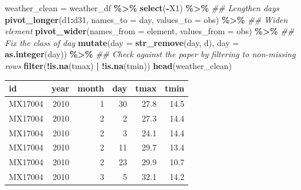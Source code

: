 \documentclass[
]{article}
\newenvironment{Shaded}{\begin{snugshade}}{\end{snugshade}}
\newcommand{\CommentTok}[1]{\textcolor[rgb]{0.56,0.35,0.01}{\textit{#1}}}
\newcommand{\DataTypeTok}[1]{\textcolor[rgb]{0.13,0.29,0.53}{#1}}
\newcommand{\KeywordTok}[1]{\textcolor[rgb]{0.13,0.29,0.53}{\textbf{#1}}}
\newcommand{\NormalTok}[1]{#1}
\newcommand{\OperatorTok}[1]{\textcolor[rgb]{0.81,0.36,0.00}{\textbf{#1}}}
\newcommand{\StringTok}[1]{\textcolor[rgb]{0.31,0.60,0.02}{#1}}
\begin{document}
\begin{Shaded}
\begin{Highlighting}[]
\NormalTok{weather\_clean =}\StringTok{ }\NormalTok{weather\_df }\OperatorTok{\%\textgreater{}\%}\StringTok{ }
\StringTok{    }\KeywordTok{select}\NormalTok{(}\OperatorTok{{-}}\NormalTok{X1) }\OperatorTok{\%\textgreater{}\%}\StringTok{ }
\StringTok{    }\CommentTok{\#\# Lengthen days}
\StringTok{    }\KeywordTok{pivot\_longer}\NormalTok{(d1}\OperatorTok{:}\NormalTok{d31, }
                 \DataTypeTok{names\_to =} \StringTok{\textquotesingle{}day\textquotesingle{}}\NormalTok{, }
                 \DataTypeTok{values\_to =} \StringTok{\textquotesingle{}obs\textquotesingle{}}\NormalTok{) }\OperatorTok{\%\textgreater{}\%}\StringTok{ }
\StringTok{    }\CommentTok{\#\# Widen \textasciigrave{}element\textasciigrave{}}
\StringTok{    }\KeywordTok{pivot\_wider}\NormalTok{(}\DataTypeTok{names\_from =}\NormalTok{ element, }
                \DataTypeTok{values\_from =}\NormalTok{ obs) }\OperatorTok{\%\textgreater{}\%}\StringTok{ }
\StringTok{    }\CommentTok{\#\# Fix the class of \textasciigrave{}day\textasciigrave{}}
\StringTok{    }\KeywordTok{mutate}\NormalTok{(}\DataTypeTok{day =} \KeywordTok{str\_remove}\NormalTok{(day, }\StringTok{\textquotesingle{}d\textquotesingle{}}\NormalTok{), }
           \DataTypeTok{day =} \KeywordTok{as.integer}\NormalTok{(day)) }\OperatorTok{\%\textgreater{}\%}\StringTok{ }
\StringTok{    }\CommentTok{\#\# Check against the paper by filtering to non{-}missing rows}
\StringTok{    }\KeywordTok{filter}\NormalTok{(}\OperatorTok{!}\KeywordTok{is.na}\NormalTok{(tmax) }\OperatorTok{|}\StringTok{ }\OperatorTok{!}\KeywordTok{is.na}\NormalTok{(tmin))}
\KeywordTok{head}\NormalTok{(weather\_clean)}
\end{Highlighting}
\end{Shaded}

\begin{tabular}{l|r|r|r|r|r}
\hline
id & year & month & day & tmax & tmin\\
\hline
MX17004 & 2010 & 1 & 30 & 27.8 & 14.5\\
\hline
MX17004 & 2010 & 2 & 2 & 27.3 & 14.4\\
\hline
MX17004 & 2010 & 2 & 3 & 24.1 & 14.4\\
\hline
MX17004 & 2010 & 2 & 11 & 29.7 & 13.4\\
\hline
MX17004 & 2010 & 2 & 23 & 29.9 & 10.7\\
\hline
MX17004 & 2010 & 3 & 5 & 32.1 & 14.2\\
\hline
\end{tabular}
\end{document}
